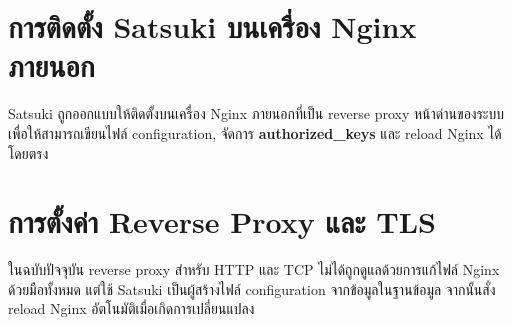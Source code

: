 \begin{figure}[htbp]
\centering
{}
\caption{}
\label{figE:KubernetesDeploy}
\end{figure}

\section{การติดตั้ง Satsuki บนเครื่อง Nginx ภายนอก}
\hspace*{1.3em}
Satsuki ถูกออกแบบให้ติดตั้งบนเครื่อง Nginx ภายนอกที่เป็น reverse proxy หน้าด่านของระบบ เพื่อให้สามารถเขียนไฟล์ configuration, จัดการ \textbf{authorized\_keys} และ reload Nginx ได้โดยตรง

\begin{figure}[htbp]
\centering
{}
\caption{}
\label{figE:SatsukiRun}
\end{figure}

\section{การตั้งค่า Reverse Proxy และ TLS}
\hspace*{1.3em}
ในฉบับปัจจุบัน reverse proxy สำหรับ HTTP และ TCP ไม่ได้ถูกดูแลด้วยการแก้ไฟล์ Nginx ด้วยมือทั้งหมด แต่ใช้ Satsuki เป็นผู้สร้างไฟล์ configuration จากข้อมูลในฐานข้อมูล จากนั้นสั่ง reload Nginx อัตโนมัติเมื่อเกิดการเปลี่ยนแปลง

